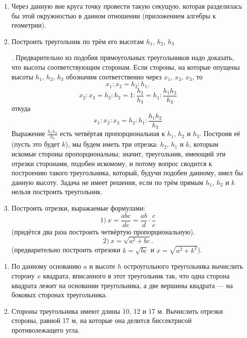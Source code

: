 {\begin{enumerate}
\item
Через данную вне круга точку провести такую секущую, которая разделилась бы этой окружностью в данном отношении (приложением алгебры к геометрии).

\item
Построить треугольник по трём его высотам $h_1$, $h_2$, $h_3$

\smallskip

.
Предварительно из подобия прямоугольных треугольников надо доказать, что высоты  соответствующим сторонам.
Если стороны, на которые опущены высоты $h_1$, $h_2$, $h_3$ обозначим соответственно через $x_1$, $x_2$, $x_3$, то
\[x_1:x_2=h_2:h_1,\]
\[x_2:x_3=h_3:h_2=1:\frac{h_2}{h_3}=h_1:\frac{h_1h_2}{h_3}\]
откуда 
\[x_1:x_2:x_3=h_2:h_1:\frac{h_1h_2}{h_3}\]
Выражение $\frac{h_1h_2}{h_3}$ есть четвёртая пропорциональная к $h_1$, $h_2$ и $h_3$.
Построив её (пусть это будет $k$), мы будем иметь три отрезка:
$h_2$, $h_1$ и $k$, которым искомые стороны пропорциональны;
значит, треугольник, имеющий эти отрезки сторонами, подобен искомому, и потому вопрос сводится к построению такого треугольника, который, будучи подобен данному, имел бы данную высоту.
Задача не имеет решения, если по трём прямым $h_1$, $h_2$ и $k$ нельзя построить треугольник.

\item
Построить отрезки, выражаемые формулами: 
\[1)\ x=\frac{abc}{de}=\frac{ab}{d}\cdot \frac{c}{e}\]
(придётся два раза построить четвёртую пропорциональную).
\[2)\ x=\sqrt{a^2+bc}.\]
(предварительно построить отрезоки $k=\sqrt{bc}$ и $x=\sqrt{a^2+k^2}$).

\end{enumerate}

\begin{center}
\end{center}

\begin{enumerate}

\item
По данному основанию $a$ и высоте $h$ остроугольного треугольника вычислить сторону $x$ квадрата, вписанного в этот треугольник так, что одна сторона квадрата лежит на основании треугольника, а две вершины квадрата — на боковых сторонах треугольника.

\item
Стороны треугольника имеют длины 10, 12 и 17 м.
Вычислить отрезки стороны, равной 17 м, на которые она делится биссектрисой противолежащего угла.


\end{enumerate}}
